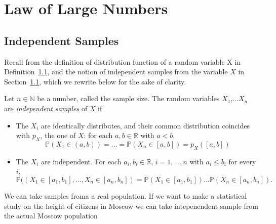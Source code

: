 	\section{Law of Large Numbers}

	\subsection{Independent Samples}

	Recall from the definition of distribution function of a random variable X in Definition~\ref{}, and the notion of independent samples from the variable $X$ in Section~\ref{}, which we rewrite below for the sake of clarity. 
		\begin{definition}
				\label{d:sample}
				Let $n\in \mathbb N$ be a number, called the sample size. The random variables $X_1$,...$X_n$ are \emph{independent samples} of $X$ if 
		\begin{itemize}
			\item The $X_i$ are identically distributes, and their common distribution coincides with $p_X$, the one of $X$: for each $a, b \in \mathbb R$ with $a <b$, 
				\begin{equation}
					\label{e:identically}
					\mathbb P(X_1 \in (a,b )) = \ldots = \mathbb P(X_n \in [a,b]) = p_X([a,b])
				\end{equation}
			\item The $X_i$ are independent. For each $a_i, b_i \in \mathbb R$, $i = 1,\ldots, n$ with $a_i \leq b_i$ for every $i$,  
				\begin{equation}
					\label{e:independence}
					\mathbb P( (X_1 \in [a_1, b_1 ], \ldots , X_n \in[a_n, b_n]) = \mathbb P(X_1 \in [a_1, b_1]) \ldots \mathbb P( X_n \in [a_n , b_n]). 
				\end{equation}
		\end{itemize}
		\end{definition}
	We can take samples froma a real population. If we want to make a statistical study on the height of citizens in Moscow we can take intepenendent sample from the actual Moscow population
\begin{knitrout}
\color{fgcolor}\begin{kframe}
\begin{alltt}
 \hlkwb{<-} 
 \hlkwb{<-} \hlopt{*} \hlopt{+} 
 \hlkwb{=} 
 \hlkwb{<-} 
\end{alltt}
\end{kframe}
\end{knitrout}
